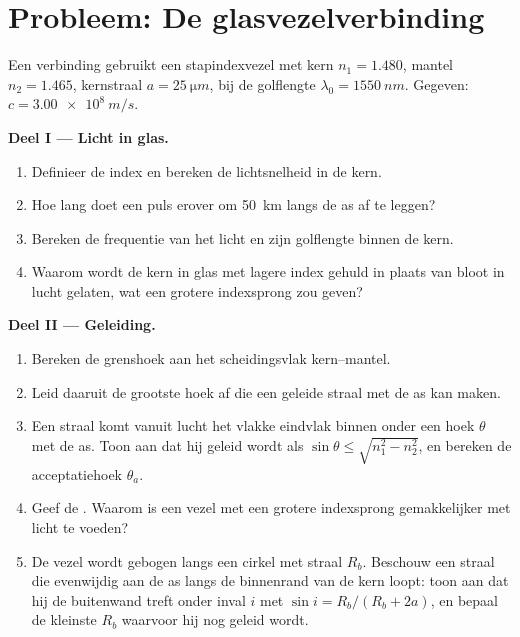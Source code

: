 \section{Probleem: De glasvezelverbinding}

\begin{problem}
\label{pb:b1:rays-reflection-refraction:1}
Een verbinding gebruikt een stapindexvezel met kern $n_1 = 1.480$, mantel
$n_2 = 1.465$, kernstraal $a = \qty{25}{\micro m}$, bij de golflengte
$\lambda_0 = \qty{1550}{nm}$. Gegeven: $c = \qty{3.00e8}{m/s}$.

\medskip
\noindent\textbf{Deel I --- Licht in glas.}
\begin{enumerate}
  \item Definieer de index en bereken de lichtsnelheid in de kern.
  \item Hoe lang doet een puls erover om \qty{50}{km} langs de as af te
        leggen?
  \item Bereken de frequentie van het licht en zijn golflengte binnen de
        kern.
  \item Waarom wordt de kern in glas met lagere index gehuld in plaats van
        bloot in lucht gelaten, wat een grotere indexsprong zou geven?
\end{enumerate}

\medskip
\noindent\textbf{Deel II --- Geleiding.}
\begin{enumerate}[resume]
  \item Bereken de grenshoek aan het scheidingsvlak kern--mantel.
  \item Leid daaruit de grootste hoek af die een geleide straal met de as
        kan maken.
  \item Een straal komt vanuit lucht het vlakke eindvlak binnen onder een
        hoek $\theta$ met de as. Toon aan dat hij geleid wordt als
        $\sin\theta \leq
        \sqrt{n_1^2 - n_2^2}$, en bereken de acceptatiehoek
        $\theta_a$.
  \item Geef de . Waarom is een vezel met een grotere
        indexsprong gemakkelijker met licht te voeden?
  \item De vezel wordt gebogen langs een cirkel met straal $R_b$. Beschouw
        een straal die evenwijdig aan de as langs de binnenrand van de kern
        loopt: toon aan dat hij de buitenwand treft onder inval $i$ met
        $\sin i = R_b/(R_b + 2a)$, en bepaal de kleinste $R_b$ waarvoor hij
        nog geleid wordt.
\end{enumerate}


\end{problem}
